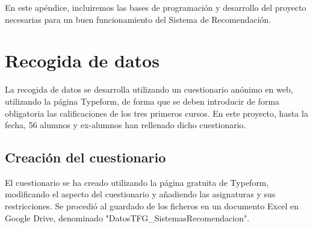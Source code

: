 En este apéndice, incluiremos las bases de programación y desarrollo del proyecto necesarias para un buen funcionamiento del Sistema de Recomendación. 

\section{Recogida de datos}
La recogida de datos se desarrolla utilizando un cuestionario anónimo en web, utilizando la página Typeform, de forma que se deben introducir de forma obligatoria las calificaciones de los tres primeros cursos. En este proyecto, hasta la fecha, 56 alumnos y ex-alumnos han rellenado dicho cuestionario. 
\subsection{Creación del cuestionario}
El cuestionario se ha creado utilizando la página gratuita de Typeform, modificando el aspecto del cuestionario y añadiendo las asignaturas y sus restricciones. 
Se procedió al  guardado de los ficheros en un documento Excel en Google Drive, denominado "DatosTFG\_SistemasRecomendacion". 

